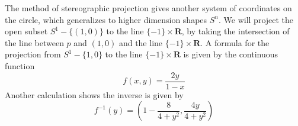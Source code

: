\begin{example}

    The method of stereographic projection gives another system of coordinates on the circle, which generalizes to higher dimension shapes $S^n$. We will project the open subset $S^1 - \{ (1,0) \}$ to the line $\{ -1 \} \times \mathbf{R}$, by taking the intersection of the line between $p$ and $(1,0)$ and the line $\{ -1 \} \times \mathbf{R}$. A formula for the projection from $S^1 - \{ 1, 0 \}$ to the line $\{ -1 \} \times \mathbf{R}$ is given by the continuous function
    \[ f(x,y) = \frac{2y}{1-x} \]
    Another calculation shows the inverse is given by
    \[ f^{-1}(y) = \left(1 - \frac{8}{4 + y^2} , \frac{4y}{4 + y^2} \right) \]
%

\end{example}
